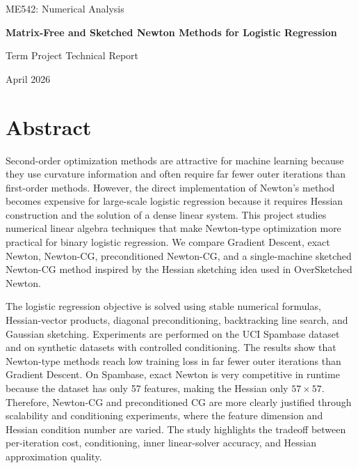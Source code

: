 \documentclass[12pt,a4paper]{report}
\begin{document}

\begin{titlepage}
    \thispagestyle{plain}
    \centering
    \vspace*{1.0cm}
    {\Large ME542: Numerical Analysis\par}
    \vspace{1.2cm}
    {\Huge\bfseries Matrix-Free and Sketched Newton Methods for Logistic Regression\par}
    \vspace{0.8cm}
    {\Large Term Project Technical Report\par}
    \vfill
    {\large April 2026\par}
\end{titlepage}

\chapter*{Abstract}

Second-order optimization methods are attractive for machine learning because they use curvature information and often require far fewer outer iterations than first-order methods. However, the direct implementation of Newton's method becomes expensive for large-scale logistic regression because it requires Hessian construction and the solution of a dense linear system. This project studies numerical linear algebra techniques that make Newton-type optimization more practical for binary logistic regression. We compare Gradient Descent, exact Newton, Newton-CG, preconditioned Newton-CG, and a single-machine sketched Newton-CG method inspired by the Hessian sketching idea used in OverSketched Newton.

The logistic regression objective is solved using stable numerical formulas, Hessian-vector products, diagonal preconditioning, backtracking line search, and Gaussian sketching. Experiments are performed on the UCI Spambase dataset and on synthetic datasets with controlled conditioning. The results show that Newton-type methods reach low training loss in far fewer outer iterations than Gradient Descent. On Spambase, exact Newton is very competitive in runtime because the dataset has only 57 features, making the Hessian only \(57\times57\). Therefore, Newton-CG and preconditioned CG are more clearly justified through scalability and conditioning experiments, where the feature dimension and Hessian condition number are varied. The study highlights the tradeoff between per-iteration cost, conditioning, inner linear-solver accuracy, and Hessian approximation quality.
\end{document}
